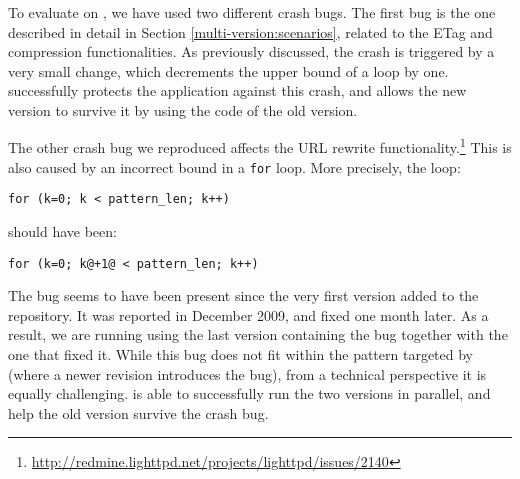 \subsubsection{\lighttpd}
\label{sec:lighttpd}

To evaluate \mx on \lighttpd, we have used two different crash bugs.
The first bug is the one described in detail in
Section \ref{multi-version:scenarios}, related to the ETag and compression
functionalities.  As previously discussed, the crash is triggered by a
very small change, which decrements the upper bound of a 
loop by one.  \mx successfully protects the application against this
crash, and allows the new version to survive it by using the code of
the old version.

The other crash bug we reproduced affects the URL rewrite
functionality.\footnote{\url{http://redmine.lighttpd.net/projects/lighttpd/issues/2140}}
This is also caused by an incorrect bound in a \lstinline`for` loop.
More precisely, the loop: 

\begin{lstlisting}[numbers=none,breaklines=true,xleftmargin=0pt]
for (k=0; k < pattern_len; k++)
\end{lstlisting}

\noindent should have been:

\begin{lstlisting}[numbers=none,breaklines=true,xleftmargin=0pt]
for (k=0; k@+1@ < pattern_len; k++)
\end{lstlisting}

The bug seems to have been present since the very first version
added to the repository.  It was reported in December 2009, and
fixed one month later.  As a result, we are running \mx using the last
version containing the bug together with the one that fixed it.  While
this bug does not fit within the pattern targeted by \mx (where a
newer revision introduces the bug), from a technical perspective it is
equally challenging.  \mx is able to successfully run the two versions
in parallel, and help the old version survive the crash bug.


